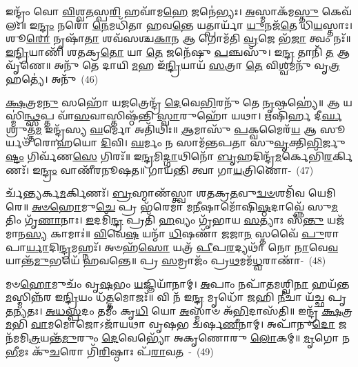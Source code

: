 {\anuvakamend[{\-\ul{𑌪𑍍𑌰}\-\-\ul{𑌤𑌿}\-𑌷𑍍𑌠𑌾𑌮᳴\-\ul{𑌹𑍍𑌵}\-𑌦𑌸𑍍𑌤𑍁᳴ \ul{𑌵𑌿}\-𑌦𑍍𑌯𑍁𑌤𑌂᳴ 𑌵\-\ul{𑌸}\-𑌨𑍍𑌤\-\ul{𑌮𑍇}\-𑌵𑍇𑌨𑍍𑌦𑍍𑌰᳴\-\ul{𑌸𑍍𑌯𑌾}\-\-𑌽𑌷𑍍𑌟𑌾𑌤𑍍𑌰𑌿𑍞᳴𑌶𑌚𑍍𑌚}]}%

𑌇𑌨𑍍𑌦𑍍𑌰𑌂᳴ 𑌵𑍋 \ul{𑌵𑌿}\-𑌶𑍍𑌵\-\ul{𑌤}\-𑌸𑍍𑌪\-\ul{𑌰𑌿} 𑌹𑌵𑌾᳴𑌮\-\ul{𑌹𑍇} 𑌜𑌨𑍇॑𑌭𑍍𑌯𑌃। \ul{𑌅}\-𑌸𑍍𑌮𑌾𑌕᳴𑌮\-\ul{𑌸𑍍𑌤𑍁} 𑌕𑍇𑌵᳴𑌲𑌃॥ 𑌇\-\ul{𑌨𑍍𑌦𑍍𑌰𑌂} 𑌨𑌰𑍋᳴ \ul{𑌨𑍇}\-𑌮𑌧𑌿᳴𑌤𑌾 𑌹𑌵\-\ul{𑌨𑍍𑌤𑍇} 𑌯𑌤𑍍𑌪𑌾𑌰𑍍𑌯𑌾᳴ \ul{𑌯𑍁}\-𑌨𑌜᳴\-\ul{𑌤𑍇} 𑌧𑌿\-\ul{𑌯}\-𑌸𑍍𑌤𑌾𑌃। 𑌶𑍂\-\ul{𑌰𑍋} 𑌨𑍃𑌷𑌾᳴\-\ul{𑌤𑌾} 𑌶𑌵᳴𑌸𑌶𑍍𑌚\-\ul{𑌕𑌾}\-𑌨 𑌆 𑌗𑍋𑌮᳴𑌤𑌿 \ul{𑌵𑍍𑌰}\-𑌜𑍇 𑌭᳴\-\ul{𑌜𑌾} 𑌤𑍍𑌵𑌂 𑌨𑌃᳴॥ \ul{𑌇}\-\-\ul{𑌨𑍍𑌦𑍍𑌰𑌿}\-𑌯𑌾𑌣𑌿᳴ 𑌶𑌤𑌕𑍍𑌰\-\ul{𑌤𑍋} 𑌯𑌾 \ul{𑌤𑍇} 𑌜𑌨𑍇᳴𑌷𑍁 \ul{𑌪}\-𑌞𑍍𑌚𑌸𑍁᳴। 𑌇\-\ul{𑌨𑍍𑌦𑍍𑌰} 𑌤𑌾𑌨𑌿᳴ \ul{𑌤} 𑌆 𑌵𑍃᳴𑌣𑍇॥ 𑌅𑌨𑍁᳴ 𑌤𑍇 𑌦𑌾𑌯𑌿 \ul{𑌮}\-𑌹 𑌇᳴\-\ul{𑌨𑍍𑌦𑍍𑌰𑌿}\-𑌯𑌾𑌯᳴ \ul{𑌸}\-𑌤𑍍𑌰𑌾 \ul{𑌤𑍇} 𑌵𑌿\-\ul{𑌶𑍍𑌵}\-𑌮𑌨𑍁᳴ 𑌵𑍃\-\ul{𑌤𑍍𑌰}\-𑌹𑌤𑍍𑌯𑍇॑। 𑌅𑌨𑍁᳴~(46)

\-\ul{𑌕𑍍𑌷}\-𑌤𑍍𑌰𑌮\-\ul{𑌨𑍁} 𑌸𑌹𑍋᳴ 𑌯\-\ul{𑌜}\-𑌤𑍍𑌰𑍇𑌨𑍍𑌦𑍍𑌰᳴ \ul{𑌦𑍇}\-𑌵𑍇\-\ul{𑌭𑌿}\-𑌰𑌨𑍁᳴ 𑌤𑍇 \ul{𑌨𑍃}\-𑌷𑌹𑍍𑌯𑍇॑॥ 𑌆 𑌯𑌸𑍍𑌮𑌿॑\-\ul{𑌨𑍍𑌥𑍍𑌸}\-𑌪𑍍𑌤 𑌵𑌾᳴\-\ul{𑌸}\-𑌵𑌾𑌸𑍍𑌤𑌿𑌷𑍍𑌠᳴𑌨𑍍𑌤𑌿 \ul{𑌸𑍍𑌵𑌾}\-𑌰𑍁𑌹𑍋᳴ 𑌯𑌥𑌾। 𑌋𑌷𑌿᳴𑌰𑍍\mbox{}𑌹 𑌦𑍀\-\ul{𑌰𑍍𑌘}\-𑌶𑍍𑌰𑍁𑌤𑍍𑌤᳴\-\ul{𑌮} 𑌇𑌨𑍍𑌦𑍍𑌰᳴𑌸𑍍𑌯 \ul{𑌘}\-𑌰𑍍𑌮𑍋 𑌅𑌤𑌿᳴𑌥𑌿𑌃॥ \ul{𑌆}\-𑌮𑌾𑌸𑍁᳴ \ul{𑌪}\-𑌕𑍍𑌵𑌮𑍈𑌰᳴\-\ul{𑌯} 𑌆 𑌸𑍂𑌰𑍍𑌯𑍞᳴ 𑌰𑍋𑌹𑌯𑍋 \ul{𑌦𑌿}\-𑌵𑌿। \ul{𑌘}\-𑌰𑍍𑌮𑌂 𑌨 𑌸𑌾𑌮᳴𑌨𑍍𑌤𑌪𑌤𑌾 𑌸𑍁\-\ul{𑌵𑍃}\-𑌕𑍍𑌤𑌿\-\ul{𑌭𑌿}\-𑌰𑍍𑌜𑍁\-\ul{𑌷𑍍𑌟𑌂} 𑌗𑌿𑌰𑍍𑌵᳴𑌣\-\ul{𑌸𑍇} 𑌗𑌿𑌰𑌃᳴॥ 𑌇\-\ul{𑌨𑍍𑌦𑍍𑌰}\-𑌮𑌿\-\ul{𑌦𑍍𑌗𑌾}\-𑌥𑌿𑌨𑍋᳴ \ul{𑌬𑍃}\-𑌹𑌦𑌿𑌨𑍍𑌦𑍍𑌰᳴\-\ul{𑌮}\-𑌰𑍍𑌕𑍇𑌭𑌿᳴\-\ul{𑌰}\-𑌰𑍍𑌕𑌿𑌣𑌃᳴। 𑌇\-\ul{𑌨𑍍𑌦𑍍𑌰𑌂} 𑌵𑌾𑌣𑍀᳴𑌰𑌨𑍂𑌷𑌤॥ 𑌗𑌾𑌯᳴𑌨𑍍𑌤𑌿 𑌤𑍍𑌵𑌾 𑌗𑌾\-\ul{𑌯}\-𑌤𑍍𑌰𑌿𑌣𑍋-~(47)

𑌰𑍍𑌚᳴\-\ul{𑌨𑍍𑌤𑍍𑌯}\-𑌰𑍍𑌕\-\ul{𑌮}\-𑌰𑍍𑌕𑌿𑌣𑌃᳴। \ul{𑌬𑍍𑌰}\-𑌹𑍍𑌮𑌾𑌣᳴𑌸𑍍𑌤𑍍𑌵𑌾 𑌶𑌤𑌕𑍍𑌰\-\ul{𑌤}\-𑌵𑍁\-\ul{𑌦𑍍𑌵}\-\-\ul{𑍞}\-𑌶𑌮𑌿᳴𑌵 𑌯𑍇𑌮𑌿𑌰𑍇॥ \ul{𑌅}\-\-\ul{𑍞}\-\-\ul{𑌹𑍋}\-𑌮𑍁\-\ul{𑌚𑍇} 𑌪𑍍𑌰 𑌭᳴𑌰𑍇𑌮𑌾 𑌮\-\ul{𑌨𑍀}\-𑌷𑌾𑌮𑍋᳴𑌷𑌿\-\ul{𑌷𑍍𑌠}\-𑌦𑌾𑌵𑍍𑌨𑍍𑌨𑍇᳴ 𑌸𑍁\-\ul{𑌮}\-𑌤𑌿𑌂 𑌗𑍃᳴\-\ul{𑌣𑌾}\-𑌨𑌾𑌃। \ul{𑌇}\-𑌦𑌮𑌿᳴\-\ul{𑌨𑍍𑌦𑍍𑌰} 𑌪𑍍𑌰𑌤𑌿᳴ \ul{𑌹}\-𑌵𑍍𑌯𑌂 𑌗𑍃᳴𑌭𑌾𑌯 \ul{𑌸}\-𑌤𑍍𑌯𑌾𑌃 𑌸᳴\-\ul{𑌨𑍍𑌤𑍁} 𑌯𑌜᳴𑌮𑌾𑌨\-\ul{𑌸𑍍𑌯} 𑌕𑌾𑌮𑌾𑌃॑॥ \ul{𑌵𑌿}\-𑌵𑍇\-\ul{𑌷} 𑌯𑌨𑍍𑌮𑌾᳴ \ul{𑌧𑌿}\-𑌷𑌣𑌾᳴ \ul{𑌜}\-𑌜𑌾\-\ul{𑌨} 𑌸𑍍𑌤𑌵𑍈᳴ \ul{𑌪𑍁}\-𑌰𑌾 𑌪𑌾\-\ul{𑌰𑍍𑌯𑌾}\-𑌦𑌿\-\ul{𑌨𑍍𑌦𑍍𑌰}\-𑌮𑌹𑍍𑌨𑌃᳴। 𑌅𑍞𑌹᳴\-\ul{𑌸𑍋} 𑌯𑌤𑍍𑌰᳴ \ul{𑌪𑍀}\-𑌪\-\ul{𑌰}\-𑌦𑍍𑌯𑌥𑌾᳴ 𑌨𑍋 \ul{𑌨𑌾}\-𑌵𑍇\-\ul{𑌵} 𑌯𑌾𑌨𑍍𑌤᳴\-\ul{𑌮𑍁}\-𑌭𑌯𑍇᳴ 𑌹𑌵𑌨𑍍𑌤𑍇॥ 𑌪𑍍𑌰 \ul{𑌸}\-𑌮𑍍𑌰𑌾𑌜𑌂᳴ 𑌪𑍍𑌰\-\ul{𑌥}\-𑌮𑌮᳴\-\ul{𑌧𑍍𑌵}\-𑌰𑌾𑌣𑌾᳴-~(48)

𑌮𑍞\-\ul{𑌹𑍋}\-𑌮𑍁𑌚𑌂᳴ 𑌵𑍃\-\ul{𑌷}\-𑌭𑌂 \ul{𑌯}\-𑌜𑍍𑌞𑌿𑌯𑌾᳴𑌨𑌾𑌮𑍍। \ul{𑌅}\-𑌪𑌾𑌂 𑌨𑌪𑌾᳴𑌤𑌮𑌶𑍍𑌵𑌿\-\ul{𑌨𑌾} 𑌹𑌯᳴𑌨𑍍𑌤\-\ul{𑌮}\-𑌸𑍍𑌮𑌿𑌨𑍍𑌨᳴𑌰 𑌇\-\ul{𑌨𑍍𑌦𑍍𑌰𑌿}\-𑌯𑌂 𑌧᳴\-\ul{𑌤𑍍𑌤}\-𑌮𑍋𑌜𑌃᳴॥ 𑌵𑌿 𑌨᳴ 𑌇\-\ul{𑌨𑍍𑌦𑍍𑌰} 𑌮𑍃𑌧𑍋᳴ 𑌜𑌹𑌿 \ul{𑌨𑍀}\-𑌚𑌾 𑌯᳴𑌚𑍍𑌛 𑌪𑍃𑌤\-\ul{𑌨𑍍𑌯}\-𑌤𑌃। \ul{𑌅}\-\-\ul{𑌧}\-\-\ul{𑌸𑍍𑌪}\-𑌦𑌂 𑌤𑌮𑍀𑌂॑ 𑌕𑍃\-\ul{𑌧𑌿} 𑌯𑍋 \ul{𑌅}\-𑌸𑍍𑌮𑌾𑍞 𑌅᳴\-\ul{𑌭𑌿}\-𑌦𑌾𑌸᳴𑌤𑌿॥ 𑌇𑌨𑍍𑌦𑍍𑌰᳴ \ul{𑌕𑍍𑌷}\-𑌤𑍍𑌰\-\ul{𑌮}\-𑌭𑌿 \ul{𑌵𑌾}\-𑌮𑌮𑍋𑌜𑍋\-𑌽𑌜𑌾᳴𑌯𑌥𑌾 𑌵𑍃𑌷𑌭 𑌚𑌰𑍍\mbox{}𑌷\-\ul{𑌣𑍀}\-𑌨𑌾𑌮𑍍। 𑌅𑌪𑌾᳴𑌨𑍁\-\ul{𑌦𑍋} 𑌜𑌨᳴𑌮𑌮𑌿\-\ul{𑌤𑍍𑌰}\-𑌯𑌨𑍍𑌤᳴\-\ul{𑌮𑍁}\-𑌰𑍁𑌂 \ul{𑌦𑍇}\-𑌵𑍇𑌭𑍍𑌯𑍋᳴ 𑌅𑌕𑍃𑌣𑍋𑌰𑍁 \ul{𑌲𑍋}\-𑌕𑌮𑍍॥ \ul{𑌮𑍃}\-𑌗𑍋 𑌨 \ul{𑌭𑍀}\-𑌮𑌃 𑌕𑍁᳴\-\ul{𑌚}\-𑌰𑍋 𑌗𑌿᳴\-\ul{𑌰𑌿}\-𑌷𑍍𑌠𑌾𑌃 𑌪᳴\-\ul{𑌰𑌾}\-𑌵\-\ul{𑌤}\-~-~(49)


